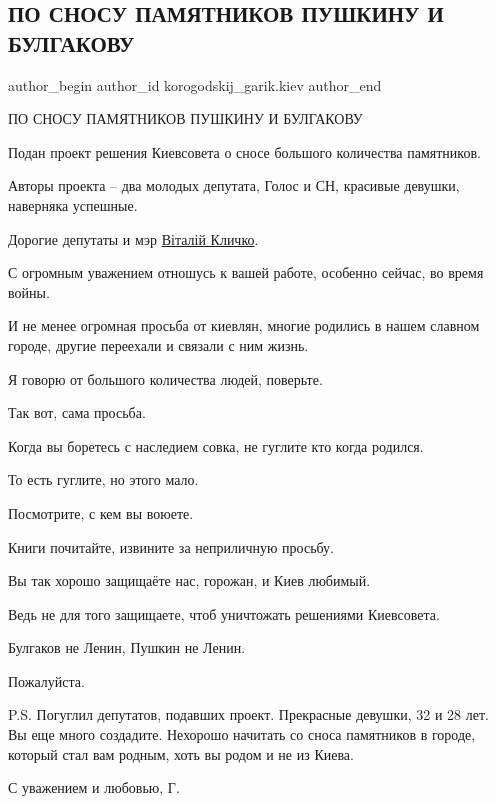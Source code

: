  
 
 
 
 
 
\subsection{ПО СНОСУ ПАМЯТНИКОВ ПУШКИНУ И БУЛГАКОВУ}
\label{sec:27_04_2022.fb.korogodskij_garik.kiev.1.pushkin_bulgakov}
 
\ifcmt
 author_begin
   author_id korogodskij_garik.kiev
 author_end
\fi

ПО СНОСУ ПАМЯТНИКОВ ПУШКИНУ И БУЛГАКОВУ

Подан проект решения Киевсовета о сносе большого количества памятников.

Авторы проекта – два молодых депутата, Голос и СН, красивые девушки, наверняка
успешные. 

Дорогие депутаты и мэр \href{https://www.facebook.com/Vitaliy.Klychko}{Віталій Кличко}. 

С огромным уважением отношусь к вашей работе, особенно сейчас, во время войны. 

И не менее огромная просьба от киевлян, многие родились в нашем славном городе,
другие переехали и связали с ним жизнь. 

Я говорю от большого количества людей, поверьте. 

Так вот, сама просьба.

Когда вы боретесь с наследием совка, не гуглите кто когда родился. 

То есть гуглите, но этого мало. 

Посмотрите, с кем вы воюете. 

Книги почитайте, извините за неприличную просьбу. 

Вы так хорошо защищаёте нас, горожан, и Киев любимый. 

Ведь не для того защищаете, чтоб уничтожать решениями Киевсовета. 

Булгаков не Ленин, Пушкин не Ленин. 

Пожалуйста. 

P.S. Погуглил депутатов, подавших проект. Прекрасные девушки, 32 и 28 лет. Вы
еще много создадите. Нехорошо начитать со сноса памятников в городе, который
стал вам родным, хоть вы родом и не из Киева. 

С уважением и любовью, Г.
